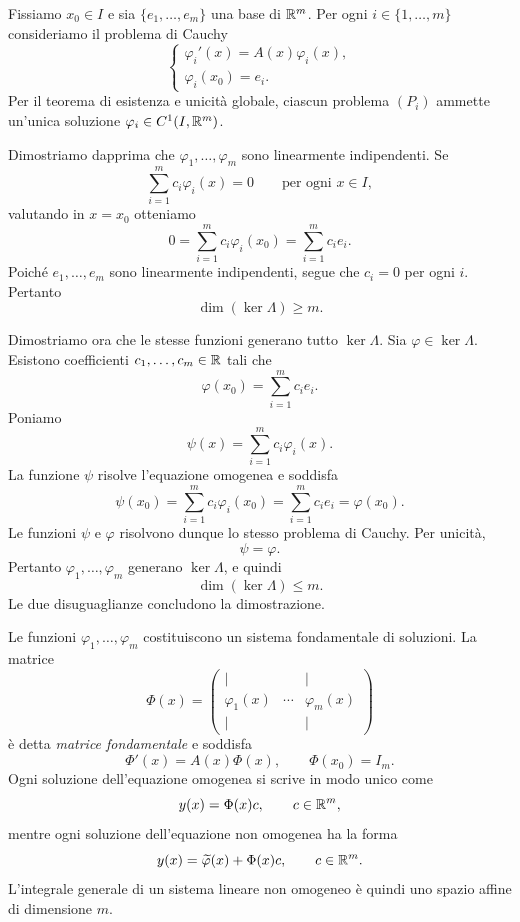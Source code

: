 \documentclass[a4paper]{article}
\begin{document}
\begin{radioactive}
\begin{snippetproof}{}
Fissiamo \(x_0\in I\) e sia \(\{e_1,\ldots,e_m\}\) una base di \(\mathbb{R}^m\). Per ogni \(i\in\{1,\ldots,m\}\) consideriamo il problema di Cauchy
\[
	\tag{\(P_i\)}
	\begin{cases}
		\varphi_i'(x)=A(x)\varphi_i(x),\\
		\varphi_i(x_0)=e_i.
	\end{cases}
\]
Per il teorema di esistenza e unicità globale, ciascun problema \((P_i)\) ammette un'unica soluzione \(\varphi_i\in C^1(I,\mathbb{R}^m)\).

Dimostriamo dapprima che \(\varphi_1,\ldots,\varphi_m\) sono linearmente indipendenti. Se
\[
	\sum_{i=1}^m c_i\varphi_i(x)=0
	\qquad\text{per ogni }x\in I,
\]
valutando in \(x=x_0\) otteniamo
\[
	0=\sum_{i=1}^m c_i\varphi_i(x_0)
	=\sum_{i=1}^m c_i e_i.
\]
Poiché \(e_1,\ldots,e_m\) sono linearmente indipendenti, segue che \(c_i=0\) per ogni \(i\). Pertanto
\[
	\dim(\ker\Lambda)\geq m.
\]

Dimostriamo ora che le stesse funzioni generano tutto \(\ker\Lambda\). Sia \(\varphi\in\ker\Lambda\). Esistono coefficienti \(c_1,\ldots,c_m\in\mathbb{R}\) tali che
\[
	\varphi(x_0)=\sum_{i=1}^m c_i e_i.
\]
Poniamo
\[
	\psi(x)=\sum_{i=1}^m c_i\varphi_i(x).
\]
La funzione \(\psi\) risolve l'equazione omogenea e soddisfa
\[
	\psi(x_0)
	=\sum_{i=1}^m c_i\varphi_i(x_0)
	=\sum_{i=1}^m c_i e_i
	=\varphi(x_0).
\]
Le funzioni \(\psi\) e \(\varphi\) risolvono dunque lo stesso problema di Cauchy. Per unicità,
\[
	\psi=\varphi.
\]
Pertanto \(\varphi_1,\ldots,\varphi_m\) generano \(\ker\Lambda\), e quindi
\[
	\dim(\ker\Lambda)\leq m.
\]
Le due disuguaglianze concludono la dimostrazione.
\end{snippetproof}
\end{radioactive}

\begin{radioactive}
Le funzioni \(\varphi_1,\ldots,\varphi_m\) costituiscono un sistema fondamentale di soluzioni. La matrice
\[
	\Phi(x)=\begin{pmatrix}
		| & & |\\
		\varphi_1(x) & \cdots & \varphi_m(x)\\
		| & & |
	\end{pmatrix}
\]
è detta \emph{matrice fondamentale} e soddisfa
\[
	\Phi'(x)=A(x)\Phi(x),
	\qquad
	\Phi(x_0)=I_m.
\]
Ogni soluzione dell'equazione omogenea si scrive in modo unico come
\[
	y(x)=\Phi(x)c,
	\qquad c\in\mathbb{R}^m,
\]
mentre ogni soluzione dell'equazione non omogenea ha la forma
\[
	y(x)=\widetilde\varphi(x)+\Phi(x)c,
	\qquad c\in\mathbb{R}^m.
\]
L'integrale generale di un sistema lineare non omogeneo è quindi uno spazio affine di dimensione \(m\).
\end{radioactive}
\end{document}
